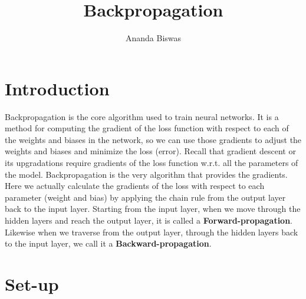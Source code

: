 \documentclass[11pt, a4paper]{article}
\title{Backpropagation}
\author{Ananda Biswas}
\date{}
\begin{document}
\maketitle

\tableofcontents

\newpage

\section{Introduction}

Backpropagation is the core algorithm used to train neural networks. It is a method for computing the gradient of the loss function with respect to each of the weights and biases in the network, so we can use those gradients to adjust the weights and biases and minimize the loss (error). Recall that gradient descent or its upgradations require gradients of the loss function w.r.t. all the parameters of the model. Backpropagation is the very algorithm that provides the gradients. \\


Here we actually calculate the gradients of the loss with respect to each parameter (weight and bias) by applying the chain rule from the output layer back to the input layer. Starting from the input layer, when we move through the hidden layers and reach the output layer, it is called a \textbf{Forward-propagation}. Likewise when we traverse from the output layer, through the hidden layers back to the input layer, we call it a \textbf{Backward-propagation}.

\section{Set-up}
\end{document}
